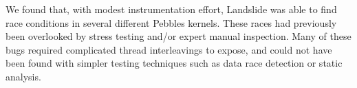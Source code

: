 \documentclass{llncs}
\begin{document}

We found that, with modest instrumentation effort, Landslide was able to find race conditions in several different Pebbles kernels. These races had previously been overlooked by stress testing and/or expert manual inspection.
Many of these bugs required complicated thread interleavings to expose, and could not have been found with simpler testing techniques such as data race detection or static analysis.

\end{document}
